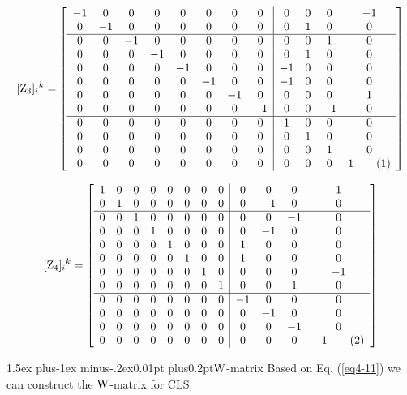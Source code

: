 \documentclass[12pt]{article}
\makeatletter
\newcommand\numberthis{\addtocounter{equation}{1}\tag{\theequation}}
\let\bm\relax
\newcommand{\bm}[1]{{\boldsymbol{#1}}}
\def\subsubsection{\@startsection{subsubsection}{3}{\z@}
          {1.5ex plus-1ex minus-.2ex}{0.01pt plus0.2pt}{\sf\boldmath}}
\makeatother
\begin{document}
\[[{\bm{\rm Z}_3}]_{i}{}^{k}= 
\left[\begin{array}{cccccccc|cccc}
 -1 & 0 & 0 & 0 & 0 & 0 & 0 & 0 & 0 & 0 & 0 & -1 \\
 0 & -1 & 0 & 0 & 0 & 0 & 0 & 0 & 0 & 1 & 0 & 0 \\
 \hline
 0 & 0 & -1 & 0 & 0 & 0 & 0 & 0 & 0 & 0 & 1 & 0 \\
 0 & 0 & 0 & -1 & 0 & 0 & 0 & 0 & 0 & 1 & 0 & 0 \\
 0 & 0 & 0 & 0 & -1 & 0 & 0 & 0 & -1 & 0 & 0 & 0 \\
 0 & 0 & 0 & 0 & 0 & -1 & 0 & 0 & -1 & 0 & 0 & 0 \\
 0 & 0 & 0 & 0 & 0 & 0 & -1 & 0 & 0 & 0 & 0 & 1 \\
 0 & 0 & 0 & 0 & 0 & 0 & 0 & -1 & 0 & 0 & -1 & 0 \\
\hline
 0 & 0 & 0 & 0 & 0 & 0 & 0 & 0 & 1 & 0 & 0 & 0 \\
 0 & 0 & 0 & 0 & 0 & 0 & 0 & 0 & 0 & 1 & 0 & 0 \\
 0 & 0 & 0 & 0 & 0 & 0 & 0 & 0 & 0 & 0 & 1 & 0 \\
 0 & 0 & 0 & 0 & 0 & 0 & 0 & 0 & 0 & 0 & 0 & 1 
\numberthis\end{array}\right] \]

\[[{\bm{\rm Z}_4}]_{i}{}^{k}= 
\left[\begin{array}{cccccccc|cccc}
 1 & 0 & 0 & 0 & 0 & 0 & 0 & 0 & 0 & 0 & 0 & 1 \\
 0 & 1 & 0 & 0 & 0 & 0 & 0 & 0 & 0 & -1 & 0 & 0 \\
 \hline
 0 & 0 & 1 & 0 & 0 & 0 & 0 & 0 & 0 & 0 & -1 & 0 \\
 0 & 0 & 0 & 1 & 0 & 0 & 0 & 0 & 0 & -1 & 0 & 0 \\
 0 & 0 & 0 & 0 & 1 & 0 & 0 & 0 & 1 & 0 & 0 & 0 \\
 0 & 0 & 0 & 0 & 0 & 1 & 0 & 0 & 1 & 0 & 0 & 0 \\
 0 & 0 & 0 & 0 & 0 & 0 & 1 & 0 & 0 & 0 & 0 & -1 \\
 0 & 0 & 0 & 0 & 0 & 0 & 0 & 1 & 0 & 0 & 1 & 0 \\
\hline
 0 & 0 & 0 & 0 & 0 & 0 & 0 & 0 & -1 & 0 & 0 & 0 \\
 0 & 0 & 0 & 0 & 0 & 0 & 0 & 0 & 0 & -1 & 0 & 0 \\
 0 & 0 & 0 & 0 & 0 & 0 & 0 & 0 & 0 & 0 & -1 & 0 \\
 0 & 0 & 0 & 0 & 0 & 0 & 0 & 0 & 0 & 0 & 0 & -1
\numberthis\end{array}\right] \]

\subsubsection{$\bm{\rm W}$-matrix}
Based on Eq. (\ref{eq4-11}) we can construct the $\bm{\rm{W}}$-matrix for CLS.
\end{document}
